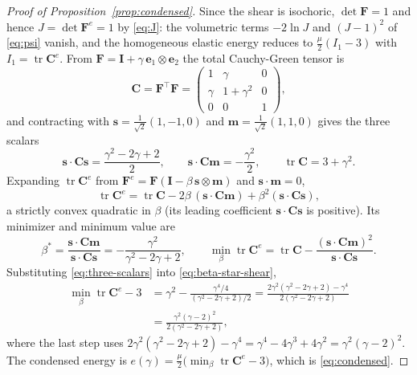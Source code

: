 \documentclass[12pt]{article}
\theoremstyle{plain}
\theoremstyle{definition}
\newcommand{\bF}{\bm{F}}
\newcommand{\bC}{\bm{C}}
\newcommand{\bs}{\bm{s}}
\newcommand{\bmm}{\bm{m}}
\newcommand{\bI}{\bm{I}}
\newcommand{\Fe}{\bF^{e}}
\newcommand{\Ce}{\bC^{e}}
\newcommand{\tr}{\operatorname{tr}}
\begin{document}
\begin{proof}[Proof of Proposition~\textup{\ref{prop:condensed}}]
Since the shear is isochoric, $\det\bF=1$ and hence $J=\det\Fe=1$ by
\eqref{eq:J}: the volumetric terms $-2\ln J$ and $(J-1)^{2}$ of \eqref{eq:psi}
vanish, and the homogeneous elastic energy reduces to $\tfrac{\mu}{2}(I_1-3)$
with $I_1=\tr\Ce$. From $\bF=\bI+\gamma\,\bm{e}_1\otimes\bm{e}_2$ the total
Cauchy-Green tensor is
\begin{equation}\label{eq:C-shear}
  \bC=\bF^{\!\top}\bF=
  \begin{pmatrix}1&\gamma&0\\[2pt]\gamma&1+\gamma^{2}&0\\[2pt]0&0&1\end{pmatrix},
\end{equation}
and contracting with $\bs=\tfrac1{\sqrt2}(1,-1,0)$ and
$\bmm=\tfrac1{\sqrt2}(1,1,0)$ gives the three scalars
\begin{equation}\label{eq:three-scalars}
  \bs\cdot\bC\bs=\frac{\gamma^{2}-2\gamma+2}{2},\qquad
  \bs\cdot\bC\bmm=-\frac{\gamma^{2}}{2},\qquad
  \tr\bC=3+\gamma^{2}.
\end{equation}
Expanding $\tr\Ce$ from $\Fe=\bF(\bI-\beta\,\bs\otimes\bmm)$ and
$\bs\cdot\bmm=0$,
\begin{equation*}
  \tr\Ce=\tr\bC-2\beta\,(\bs\cdot\bC\bmm)+\beta^{2}(\bs\cdot\bC\bs),
\end{equation*}
a strictly convex quadratic in $\beta$ (its leading coefficient
$\bs\cdot\bC\bs$ is positive). Its minimizer and minimum value are
\begin{equation}\label{eq:beta-star-shear}
  \beta^{\ast}=\frac{\bs\cdot\bC\bmm}{\bs\cdot\bC\bs}
  =-\frac{\gamma^{2}}{\gamma^{2}-2\gamma+2},\qquad
  \min_{\beta}\tr\Ce=\tr\bC-\frac{(\bs\cdot\bC\bmm)^{2}}{\bs\cdot\bC\bs}.
\end{equation}
Substituting \eqref{eq:three-scalars} into \eqref{eq:beta-star-shear},
\begin{equation}\label{eq:trCe-min}
\begin{split}
  \min_{\beta}\tr\Ce-3
  &=\gamma^{2}-\frac{\gamma^{4}/4}{(\gamma^{2}-2\gamma+2)/2}
  =\frac{2\gamma^{2}(\gamma^{2}-2\gamma+2)-\gamma^{4}}{2(\gamma^{2}-2\gamma+2)}\\
  &=\frac{\gamma^{2}(\gamma-2)^{2}}{2(\gamma^{2}-2\gamma+2)},
\end{split}
\end{equation}
where the last step uses
$2\gamma^{2}(\gamma^{2}-2\gamma+2)-\gamma^{4}
=\gamma^{4}-4\gamma^{3}+4\gamma^{2}=\gamma^{2}(\gamma-2)^{2}$. The
condensed energy is $e(\gamma)=\tfrac{\mu}{2}\bigl(\min_{\beta}\tr\Ce-3\bigr)$,
which is \eqref{eq:condensed}. 
\end{proof}
\end{document}
